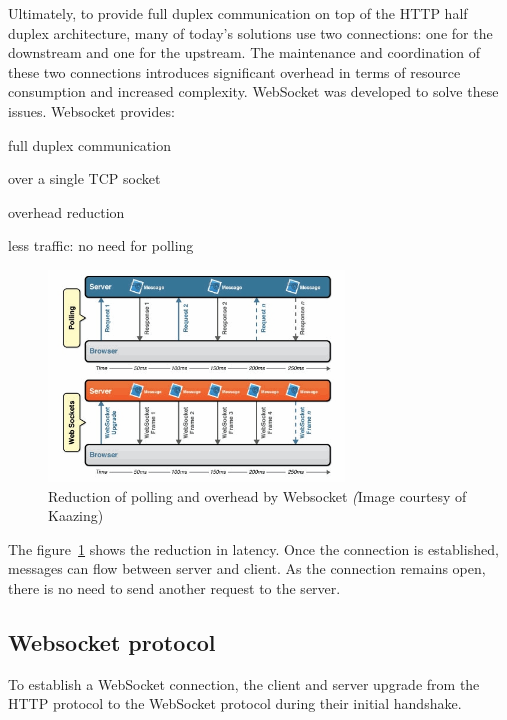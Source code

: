\documentclass[pdftex,10pt,a4paper]{report}
\newenvironment{packed_item}{
\begin{itemize}
  \setlength{\itemsep}{1pt}
  \setlength{\parskip}{0pt}
  \setlength{\parsep}{0pt}
}{\end{itemize}}
\begin{document}
Ultimately, to provide full duplex communication on top of the HTTP half duplex architecture, many of today's solutions use two connections: one for the downstream and one for the upstream. The maintenance and coordination of these two connections introduces significant overhead in terms of resource consumption and increased complexity. WebSocket was developed to solve these issues. Websocket provides:
\begin{packed_item}
	\item full duplex communication
	\item over a single TCP socket
	\item overhead reduction
	\item less traffic: no need for polling
\end{packed_item}

\begin{figure}[h!]
		\centering
		\includegraphics[width=0.7\textwidth]{./ws_poll.jpg}
		\caption{Reduction of polling and overhead by Websocket \textit(Image courtesy of Kaazing)}
		\label{Reduction of polling and overhead by Websocket}
\end{figure}

The figure~\ref{Reduction of polling and overhead by Websocket} shows the reduction in latency. Once the connection is established, messages can flow between server and client. As the connection remains open, there is no need to send another request to the server.

\subsection{Websocket protocol}

To establish a WebSocket connection, the client and server upgrade from the HTTP protocol to the WebSocket protocol during their initial handshake. \\
\end{document}
